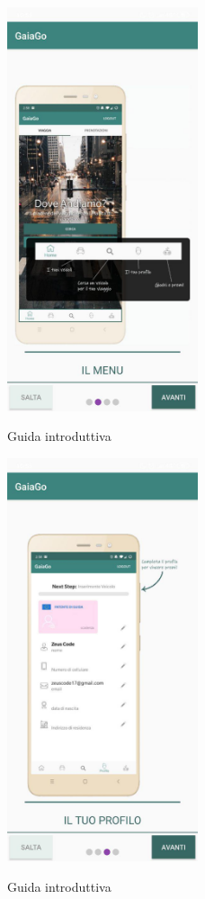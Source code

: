 \begin{figure}[H] 
	\centering 
	\includegraphics[width=0.5\textwidth]{res/images/intro2.jpg}\\
	\caption{Guida introduttiva}
	\label{guidaintroduttiva2}
\end{figure}
\begin{figure}[H] 
	\centering 
	\includegraphics[width=0.5\textwidth]{res/images/intro3.jpg}\\
	\caption{Guida introduttiva}
	\label{guidaintroduttiva3}
\end{figure}
